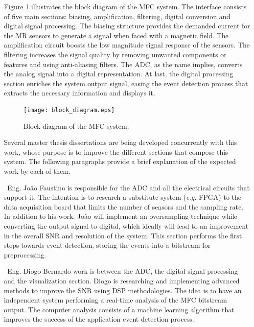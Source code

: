 Figure \ref{figure:mfc-block-diagram} illustrates the block diagram of the \ac{MFC} system. The interface consists of five main sections: biasing, amplification, filtering, digital conversion and digital signal processing. The biasing structure provides the demanded current for the \ac{MR} sensors to generate a signal when faced with a magnetic field. The amplification circuit boosts the low magnitude signal response of the sensors. The filtering increases the signal quality by removing unwanted components or features and using anti-aliasing filters. The \ac{ADC}, as the name implies, converts the analog signal into a digital representation. At last, the digital processing section enriches the system output signal, easing the event detection process that extracts the necessary information and displays it.

\begin{figure}[!ht]
    \centering
    \texttt{[image: block\_diagram.eps]}
    \caption{Block diagram of the MFC system.}
    \label{figure:mfc-block-diagram}
\end{figure}

Several master thesis dissertations are being developed concurrently with this work, whose purpose is to improve the different sections that compose this system. The following paragraphs provide a brief explanation of the expected work by each of them.

\noindent
\textbullet \, Eng. João Faustino is responsible for the \ac{ADC} and all the electrical circuits that support it. The intention is to research a substitute system (\textit{e.g.} \ac{FPGA}) to the data acquisition board that limits the number of sensors and the sampling rate. In addition to his work, João will implement an oversampling technique while converting the output signal to digital, which ideally will lead to an improvement in the overall \ac{SNR} and resolution of the system. This section performs the first steps towards event detection, storing the events into a bitstream for preprocessing.

\noindent
\textbullet \, Eng. Diogo Bernardo work is between the \ac{ADC}, the digital signal processing and the visualization section. Diogo is researching and implementing advanced methods to improve the \ac{SNR} using \ac{DSP} methodologies. The idea is to have an independent system performing a real-time analysis of the \ac{MFC} bitstream output. The computer analysis consists of a machine learning algorithm that improves the success of the application event detection process.

